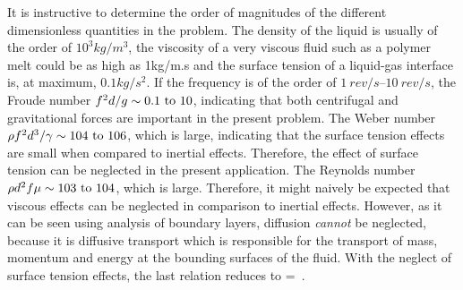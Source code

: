 \begin{solution}
It is instructive to determine the order of magnitudes of the different dimensionless quantities in the problem. The density of the liquid is usually of the order of $\si{10^3}{kg/m^3}$, the viscosity of a very viscous fluid such as a polymer melt could be as high as \si{1}{kg/m.s} and the surface tension of a liquid-gas interface is, at maximum, $\si{0.1}{kg/s^2}$. If the frequency is of the order of $\SIrange{1}{10}{rev/s}$, the Froude number $\freq^2\diam/\grav\sim\numrange{0.1}{10}$, indicating that both centrifugal and gravitational forces are important in the present problem. The Weber number $\dens\freq^2\diam^3/\surftens\sim\numrange{104}{106}$, which is large, indicating that the surface tension effects are small when compared to inertial effects. Therefore, the effect of surface tension can be neglected in the present application. The Reynolds number $\dens\diam^2\freq\dynvis\sim\numrange{103}{104}$, which is large. Therefore, it might naively be expected that viscous effects can be neglected in comparison to inertial effects. However, as it can be seen using analysis of boundary layers, diffusion \emph{cannot} be neglected, because it is diffusive transport which is responsible for the transport of mass, momentum and energy at the bounding surfaces of the fluid. With the neglect of surface tension effects, the last relation reduces to
\beq
\dfrac{\power}{\freq^3\diam^5\dens} = \dimfunc\vat{
                                                \dfrac{\freq\diam^2\dens}{\dynvis},
                                                \dfrac{\freq^2\diam}{\grav}
                                                }\,.
\eeq


\end{solution}
